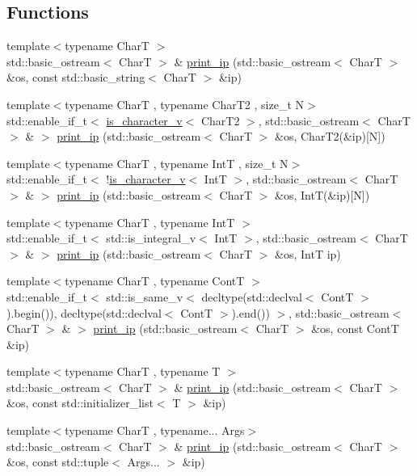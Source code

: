 \subsection*{Functions}
\begin{DoxyCompactItemize}
\item 
{\footnotesize template$<$typename CharT $>$ }\\std\+::basic\+\_\+ostream$<$ CharT $>$ \& \hyperlink{namespacegriha_a96b354d613153a0e77c127911a2e1ae0}{print\+\_\+ip} (std\+::basic\+\_\+ostream$<$ CharT $>$ \&os, const std\+::basic\+\_\+string$<$ CharT $>$ \&ip)
\item 
{\footnotesize template$<$typename CharT , typename Char\+T2 , size\+\_\+t N$>$ }\\std\+::enable\+\_\+if\+\_\+t$<$ \hyperlink{namespacegriha_af6e5a84a5dad7d2123491eb7124aa2e3}{is\+\_\+character\+\_\+v}$<$ Char\+T2 $>$, std\+::basic\+\_\+ostream$<$ CharT $>$ \& $>$ \hyperlink{namespacegriha_a817be22c2aa82d5baf17c5017e55691e}{print\+\_\+ip} (std\+::basic\+\_\+ostream$<$ CharT $>$ \&os, Char\+T2(\&ip)\mbox{[}N\mbox{]})
\item 
{\footnotesize template$<$typename CharT , typename IntT , size\+\_\+t N$>$ }\\std\+::enable\+\_\+if\+\_\+t$<$ !\hyperlink{namespacegriha_af6e5a84a5dad7d2123491eb7124aa2e3}{is\+\_\+character\+\_\+v}$<$ IntT $>$, std\+::basic\+\_\+ostream$<$ CharT $>$ \& $>$ \hyperlink{namespacegriha_ad85213a0206e4696a1896ef86a2f5fe2}{print\+\_\+ip} (std\+::basic\+\_\+ostream$<$ CharT $>$ \&os, IntT(\&ip)\mbox{[}N\mbox{]})
\item 
{\footnotesize template$<$typename CharT , typename IntT $>$ }\\std\+::enable\+\_\+if\+\_\+t$<$ std\+::is\+\_\+integral\+\_\+v$<$ IntT $>$, std\+::basic\+\_\+ostream$<$ CharT $>$ \& $>$ \hyperlink{namespacegriha_a0d818d9e193ea017b59d92f90a34655e}{print\+\_\+ip} (std\+::basic\+\_\+ostream$<$ CharT $>$ \&os, IntT ip)
\item 
{\footnotesize template$<$typename CharT , typename ContT $>$ }\\std\+::enable\+\_\+if\+\_\+t$<$ std\+::is\+\_\+same\+\_\+v$<$ decltype(std\+::declval$<$ ContT $>$).begin()), decltype(std\+::declval$<$ ContT $>$).end()) $>$, std\+::basic\+\_\+ostream$<$ CharT $>$ \& $>$ \hyperlink{namespacegriha_aec9b9d0da27b12b55e2219bf5f643441}{print\+\_\+ip} (std\+::basic\+\_\+ostream$<$ CharT $>$ \&os, const ContT \&ip)
\item 
{\footnotesize template$<$typename CharT , typename T $>$ }\\std\+::basic\+\_\+ostream$<$ CharT $>$ \& \hyperlink{namespacegriha_ace3784a170d7c105da4112afc66282a8}{print\+\_\+ip} (std\+::basic\+\_\+ostream$<$ CharT $>$ \&os, const std\+::initializer\+\_\+list$<$ T $>$ \&ip)
\item 
{\footnotesize template$<$typename CharT , typename... Args$>$ }\\std\+::basic\+\_\+ostream$<$ CharT $>$ \& \hyperlink{namespacegriha_a0447b82916ce6af203921f27f996f3c7}{print\+\_\+ip} (std\+::basic\+\_\+ostream$<$ CharT $>$ \&os, const std\+::tuple$<$ Args... $>$ \&ip)
\end{DoxyCompactItemize}
